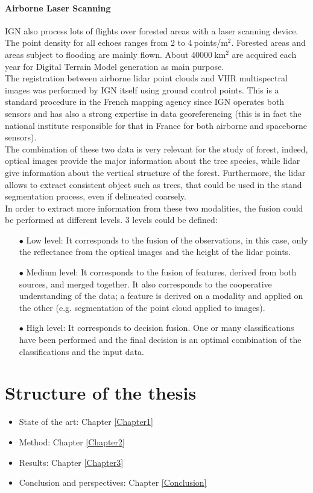 \paragraph{Airborne Laser Scanning \\}
IGN also process lots of flights over forested areas with a laser scanning device. The point density for all echoes ranges from 2 to 4$\:$points/m$^{2}$. Forested areas and areas subject to flooding are mainly flown. About 40000$\:$km$^{2}$ are acquired each year for Digital Terrain Model generation as main purpose. \\

The registration between airborne lidar point clouds and VHR multispectral images was performed by IGN itself using ground control points. This is a standard procedure in the French mapping agency since IGN operates both sensors and has also a strong expertise in data georeferencing (this is in fact the national institute responsible for that in France for both airborne and spaceborne sensors). \\

The combination of these two data is very relevant for the study of forest, indeed, optical images provide the major information about the tree species, while lidar give information about the vertical structure of the forest. Furthermore, the lidar allows to extract consistent object such as trees, that could be used in the stand segmentation process, even if delineated coarsely. \\

In order to extract more information from these two modalities, the fusion could be performed at different levels. 3 levels could be defined:
\begin{itemize}
\item[$\bullet$] Low level: It corresponds to the fusion of the observations, in this case, only the reflectance from the optical images and the height of the lidar points.
\item[$\bullet$] Medium level: It corresponds to the fusion of features, derived from both sources, and merged together. It also corresponds to the cooperative understanding of the data; a feature is derived on a modality and applied on the other (e.g. segmentation of the point cloud applied to images).
\item[$\bullet$] High level: It corresponds to decision fusion. One or many classifications have been performed and the final decision is an optimal combination of the classifications and the input data.
\end{itemize}

\section{Structure of the thesis}

\begin{itemize}
\item State of the art: Chapter \ref{Chapter1}
\item Method: Chapter \ref{Chapter2}
\item Results: Chapter \ref{Chapter3}
\item Conclusion and perspectives: Chapter \ref{Conclusion}
\end{itemize}

\stopcontents[chapters]
